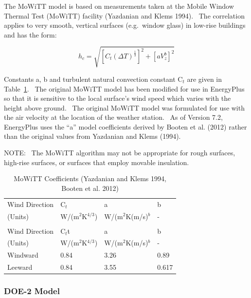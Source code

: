 The MoWiTT model is based on measurements taken at the Mobile Window Thermal Test (MoWiTT) facility (Yazdanian and Klems 1994).~ The correlation applies to very smooth, vertical surfaces (e.g.~window glass) in low-rise buildings and has the form:

\begin{equation}
{h_c} = \sqrt {{{\left[ {{C_t}{{\left( {\Delta T} \right)}^{\frac{1}{3}}}} \right]}^2} + {{\left[ {aV_z^b} \right]}^2}}
\end{equation}

Constants a, b and turbulent natural convection constant C\(_{t}\) are given in Table~\ref{table:mowitt-coefficients-yazdanian-and-klems-1994}.~ The original MoWiTT model has been modified for use in EnergyPlus so that it is sensitive to the local surface's wind speed which varies with the height above ground.~ The original MoWiTT model was formulated for use with the air velocity at the location of the weather station.~ As of Version 7.2, EnergyPlus uses the ``a'' model coefficients derived by Booten et al. (2012) rather than the original values from Yazdanian and Klems (1994).

NOTE:~ The MoWiTT algorithm may not be appropriate for rough surfaces, high-rise surfaces, or surfaces that employ movable insulation.

\begin{longtable}[c]{@{}llll@{}}
\caption{MoWiTT Coefficients (Yazdanian and Klems 1994, Booten et al. 2012) \label{table:mowitt-coefficients-yazdanian-and-klems-1994}} \tabularnewline
\toprule
Wind Direction & C\(_t\) & a & b \tabularnewline
(Units) & W/(m\(^{2}\)K\(^{4/3}\)) & W/(m\(^{2}\)K(m/s)\(^{b}\) & - \tabularnewline
\midrule
\endfirsthead

\caption[]{MoWiTT Coefficients (Yazdanian and Klems 1994, Booten et al. 2012)} \tabularnewline
\toprule
Wind Direction & C\(_t\)t & a & b \tabularnewline
(Units) & W/(m\(^{2}\)K\(^{4/3}\)) & W/(m\(^{2}\)K(m/s)\(^{b}\) & - \tabularnewline
\midrule
\endhead

Windward & 0.84 & 3.26 & 0.89 \tabularnewline
Leeward & 0.84 & 3.55 & 0.617 \tabularnewline
\bottomrule
\end{longtable}

\subsubsection{DOE-2 Model}\label{doe-2-model}

